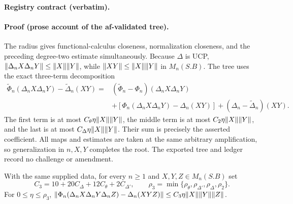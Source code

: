 \noindent\textbf{Registry contract (verbatim).}

\paragraph{Proof (prose account of the af-validated tree).}
The radius gives functional-calculus closeness, normalization closeness, and the preceding
degree-two estimate simultaneously.  Because $\Delta$ is UCP,
$\lVert \Delta_nX\Delta_nY\rVert\le\lVert X\rVert\lVert Y\rVert$, while
$\lVert XY\rVert\le\lVert X\rVert\lVert Y\rVert$ in $M_n(S.B)$.  The tree uses the exact three-term decomposition
\begin{align*}
 \widetilde\Phi_n(\Delta_nX\Delta_nY)-\widetilde\Delta_n(XY)
 ={}&(\widetilde\Phi_n-\Phi_n)(\Delta_nX\Delta_nY)\\
 &+[\Phi_n(\Delta_nX\Delta_nY)-\Delta_n(XY)]
 +(\Delta_n-\widetilde\Delta_n)(XY).
\end{align*}
The first term is at most $C_\theta\eta\lVert X\rVert\lVert Y\rVert$, the middle term is at most
$C_2\eta\lVert X\rVert\lVert Y\rVert$, and the last is at most
$C_\Delta\eta\lVert X\rVert\lVert Y\rVert$.  Their sum is precisely the asserted coefficient.
All maps and estimates are taken at the same arbitrary amplification, so generalization in
$n,X,Y$ completes the root.  The exported tree and ledger record no challenge or amendment.

\begin{lemma}\label{lem:routef-degree-three-estimate}
With the same supplied data, for every $n\ge1$ and $X,Y,Z\in M_n(S.B)$ set
\[
 C_3=10+20C_\Delta+12C_\theta+2C_{\Delta'},\qquad
 \rho_3=\min\{\rho_\theta,\rho_{\Delta'},\rho_\Delta,\rho_2\}.
\]
For $0\le\eta\le\rho_3$,
$\lVert \Phi_n(\Delta_nX\Delta_nY\Delta_nZ)-\Delta_n(XYZ)\rVert
\le C_3\eta\lVert X\rVert\lVert Y\rVert\lVert Z\rVert$.
\end{lemma}

